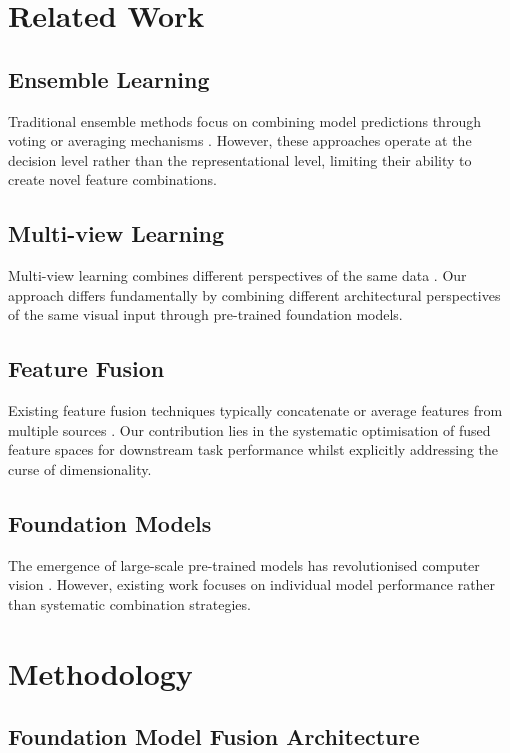 \documentclass[11pt,a4paper]{article}
\begin{document}
\section{Related Work}

\subsection{Ensemble Learning}
Traditional ensemble methods focus on combining model predictions through voting or averaging mechanisms \cite{dietterich2000ensemble}. However, these approaches operate at the decision level rather than the representational level, limiting their ability to create novel feature combinations.

\subsection{Multi-view Learning}
Multi-view learning combines different perspectives of the same data \cite{xu2013survey}. Our approach differs fundamentally by combining different architectural perspectives of the same visual input through pre-trained foundation models.

\subsection{Feature Fusion}
Existing feature fusion techniques typically concatenate or average features from multiple sources \cite{lahat2015multimodal}. Our contribution lies in the systematic optimisation of fused feature spaces for downstream task performance whilst explicitly addressing the curse of dimensionality.

\subsection{Foundation Models}
The emergence of large-scale pre-trained models has revolutionised computer vision \cite{bommasani2021opportunities}. However, existing work focuses on individual model performance rather than systematic combination strategies.

\section{Methodology}

\subsection{Foundation Model Fusion Architecture}
\end{document}
